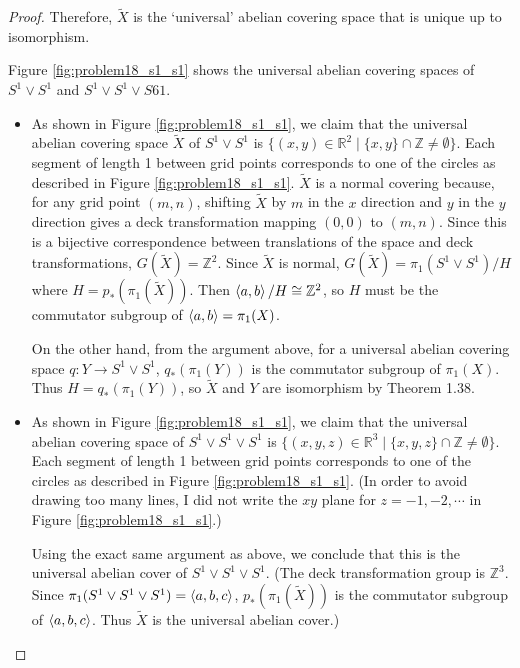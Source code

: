 \documentclass[12pt, psamsfonts]{amsart}
\theoremstyle{definition}
\theoremstyle{remark}
\numberwithin{equation}{section}
\begin{document}
\begin{proof}
  Therefore, $\tilde{X}$ is the `universal' abelian covering space that is unique up to isomorphism.

  Figure \ref{fig:problem18_s1_s1} shows the universal abelian covering spaces of $S^1 \vee S^1$ and $S^1 \vee S^1 \vee S61$.
  \begin{itemize}
    \item
      As shown in Figure \ref{fig:problem18_s1_s1}, we claim that the universal abelian covering space $\tilde{X}$ of $S^1 \vee S^1$ is $\{ (x, y) \in \mathbb{R}^2 \mid \{ x, y \} \cap \mathbb{Z} \ne \emptyset \}$.
      Each segment of length 1 between grid points corresponds to one of the circles as described in Figure \ref{fig:problem18_s1_s1}.
      $\tilde{X}$ is a normal covering because, for any grid point $(m, n)$, shifting $\tilde{X}$ by $m$ in the $x$ direction and $y$ in the $y$ direction gives a deck transformation mapping $(0, 0)$ to $(m, n)$.
      Since this is a bijective correspondence between translations of the space and deck transformations, $G(\tilde{X}) = \mathbb{Z}^2$.
      Since $\tilde{X}$ is normal, $G(\tilde{X}) = \pi_1(S^1 \vee S^1) / H$ where $H = p_*(\pi_1(\tilde{X}))$.
      Then $\ev{a, b} / H \cong \mathbb{Z}^2$, so $H$ must be the commutator subgroup of $\ev{a, b} = \pi_1(X)$.

      On the other hand, from the argument above, for a universal abelian covering space $q: Y \rightarrow S^1 \vee S^1$, $q_*(\pi_1(Y))$ is the commutator subgroup of $\pi_1(X)$.
      Thus $H = q_*(\pi_1(Y))$, so $\tilde{X}$ and $Y$ are isomorphism by Theorem 1.38.
    \item
       As shown in Figure \ref{fig:problem18_s1_s1}, we claim that the universal abelian covering space of $S^1 \vee S^1 \vee S^1$ is $\{ (x, y, z) \in \mathbb{R}^3 \mid \{ x, y, z \} \cap \mathbb{Z} \ne \emptyset \}$.
      Each segment of length 1 between grid points corresponds to one of the circles as described in Figure \ref{fig:problem18_s1_s1}.
      (In order to avoid drawing too many lines, I did not write the $xy$ plane for $z = -1, -2, \cdots$ in Figure \ref{fig:problem18_s1_s1}.)

      Using the exact same argument as above, we conclude that this is the universal abelian cover of $S^1 \vee S^1 \vee S^1$.
      (The deck transformation group is $\mathbb{Z}^3$.
      Since $\pi_1(S^1 \vee S^1 \vee S^1) = \ev{a, b, c}$, $p_*(\pi_1(\tilde{X}))$ is the commutator subgroup of $\ev{a, b, c}$.
      Thus $\tilde{X}$ is the universal abelian cover.)
  \end{itemize}


\end{proof}
\end{document}
